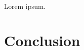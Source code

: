 \documentclass[12pt,twocolumn,tighten]{aastex62}
\begin{document}
Lorem ipsum.

\section{Conclusion}
\label{sec:conclusion}

\end{document}
